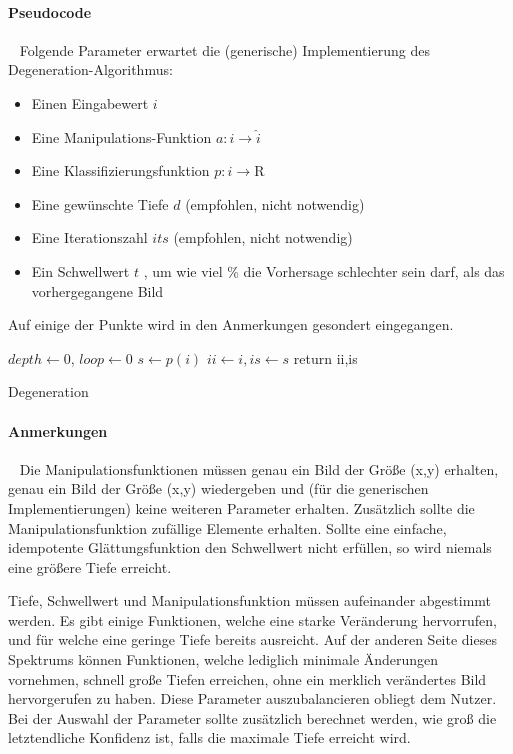 \paragraph{Pseudocode} ~\newline 
Folgende Parameter erwartet die (generische) Implementierung des Degeneration-Algorithmus: 
\begin{itemize}
	\item Einen Eingabewert $i$
	\item Eine Manipulations-Funktion $a : i \rightarrow \hat{i}$
	\item Eine Klassifizierungsfunktion $p : i \rightarrow \mathrm{R}$
	\item Eine gewünschte Tiefe $d$ (empfohlen, nicht notwendig)
	\item Eine Iterationszahl $its$ (empfohlen, nicht notwendig)
	\item Ein Schwellwert $t$ , um wie viel \% die Vorhersage schlechter sein darf, als das vorhergegangene Bild 
\end{itemize}
Auf einige der Punkte wird in den Anmerkungen gesondert eingegangen. ~\newline
\IncMargin{1em}
\begin{algorithm}
	\BlankLine
	$depth  \leftarrow 0$, $loop \leftarrow0$ \;
	$s \leftarrow p(i)$\;
	$ii \leftarrow i , is \leftarrow s$ \;
	return ii,is\;
	
	\caption{Degeneration}\label{algo_degen}
\end{algorithm}\DecMargin{1em}
\newpage
\paragraph{Anmerkungen}~\newline 
Die Manipulationsfunktionen müssen genau ein Bild der Größe (x,y) erhalten, genau ein Bild der Größe (x,y) wiedergeben und (für die generischen Implementierungen) keine weiteren Parameter erhalten. Zusätzlich sollte die Manipulationsfunktion zufällige Elemente erhalten. Sollte eine einfache, idempotente Glättungsfunktion den Schwellwert nicht erfüllen, so wird niemals eine größere Tiefe erreicht.

Tiefe, Schwellwert und Manipulationsfunktion müssen aufeinander abgestimmt werden. Es gibt einige Funktionen, welche eine starke Veränderung hervorrufen, und für welche eine geringe Tiefe bereits ausreicht. Auf der anderen Seite dieses Spektrums können Funktionen, welche lediglich minimale Änderungen vornehmen, schnell große Tiefen erreichen, ohne ein merklich verändertes Bild hervorgerufen zu haben. Diese Parameter auszubalancieren obliegt dem Nutzer. Bei der Auswahl der Parameter sollte zusätzlich berechnet werden, wie groß die letztendliche Konfidenz ist, falls die maximale Tiefe erreicht wird. 


